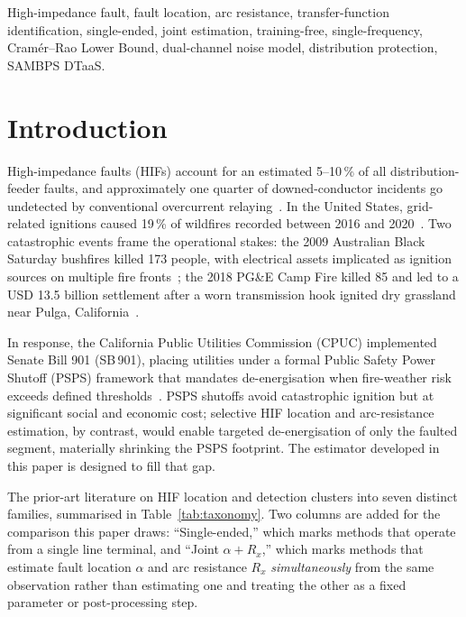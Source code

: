 \documentclass[journal]{IEEEtran}
\begin{document}
\begin{IEEEkeywords}
High-impedance fault, fault location, arc resistance, transfer-function
identification, single-ended, joint estimation, training-free,
single-frequency, Cram\'er--Rao Lower Bound, dual-channel noise model,
distribution protection, SAMBPS DTaaS.
\end{IEEEkeywords}

\section{Introduction}\label{sec:intro}

High-impedance faults (HIFs) account for an estimated 5--10\,\% of all
distribution-feeder faults, and approximately one quarter of
downed-conductor incidents go undetected by conventional overcurrent
relaying~\cite{PSRC1996D15}.  In the United States, grid-related
ignitions caused 19\,\% of wildfires recorded between 2016 and
2020~\cite{NREL2023TP5R0080746}.  Two catastrophic events frame the
operational stakes: the 2009 Australian Black Saturday bushfires
killed 173 people, with electrical assets implicated as ignition
sources on multiple fire fronts~\cite{BlackSaturday2009RoyalCommission};
the 2018 PG\&E Camp Fire killed 85 and led to a USD 13.5 billion
settlement after a worn transmission hook ignited dry grassland near
Pulga, California~\cite{CampFire2018PGE}.

In response, the California Public Utilities Commission (CPUC)
implemented Senate Bill 901 (SB\,901), placing utilities under a
formal Public Safety Power Shutoff (PSPS) framework that mandates
de-energisation when fire-weather risk exceeds defined
thresholds~\cite{CPUC2018SB901}.  PSPS shutoffs avoid catastrophic
ignition but at significant social and economic cost; selective HIF
location and arc-resistance estimation, by contrast, would enable
targeted de-energisation of only the faulted segment, materially
shrinking the PSPS footprint.  The estimator developed in this paper
is designed to fill that gap.

The prior-art literature on HIF location and detection clusters into
seven distinct families, summarised in Table~\ref{tab:taxonomy}.  Two
columns are added for the comparison this paper draws:
``Single-ended,'' which marks methods that operate from a single line
terminal, and ``Joint $\alpha\!+\!R_x$,'' which marks methods that
estimate fault location $\alpha$ and arc resistance $R_x$
\emph{simultaneously} from the same observation rather than estimating
one and treating the other as a fixed parameter or post-processing
step.
\end{document}
